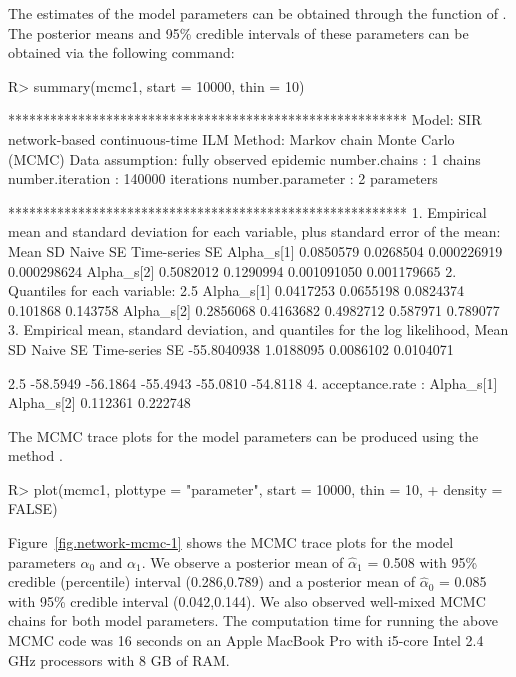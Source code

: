 \documentclass[nojss,shortnames]{jss}
\begin{document}
The estimates of the model parameters can be obtained through the   function of .  
The posterior means and 95\% credible intervals of these parameters can be obtained via the following command:
\begin{Sinput}
R> summary(mcmc1, start = 10000, thin = 10)
\end{Sinput}
\begin{Soutput}
********************************************************* 
Model: SIR network-based continuous-time ILM 
Method: Markov chain Monte Carlo (MCMC) 
Data assumption: fully observed epidemic 
number.chains : 1 chains 
number.iteration : 140000 iterations 
number.parameter : 2 parameters 

********************************************************* 
 1. Empirical mean and standard deviation for each variable,
plus standard error of the mean:
                Mean        SD    Naive SE Time-series SE
Alpha_s[1] 0.0850579 0.0268504 0.000226919    0.000298624
Alpha_s[2] 0.5082012 0.1290994 0.001091050    0.001179665
 2. Quantiles for each variable:
                2.5%       25%       50%      75%    97.5%
Alpha_s[1] 0.0417253 0.0655198 0.0824374 0.101868 0.143758
Alpha_s[2] 0.2856068 0.4163682 0.4982712 0.587971 0.789077
 3. Empirical mean, standard deviation, and quantiles for the log likelihood,
          Mean             SD       Naive SE Time-series SE 
   -55.8040938      1.0188095      0.0086102      0.0104071 

    2.5%      25%      50%      75%    97.5% 
-58.5949 -56.1864 -55.4943 -55.0810 -54.8118 
 4. acceptance.rate : 
Alpha_s[1] Alpha_s[2] 
  0.112361   0.222748 
\end{Soutput}

The MCMC trace plots for  the model parameters can be produced using the  method .
\begin{Sinput}
R> plot(mcmc1, plottype = "parameter", start = 10000, thin = 10, 
+    density = FALSE)
\end{Sinput}

Figure~\ref{fig.network-mcmc-1} shows the MCMC trace plots for the model parameters $\alpha_{0}$ and $\alpha_{1}$. We observe a posterior mean of $\hat{\alpha}_{1}$ = 0.508 with 95\% credible (percentile) interval (0.286,0.789) and a posterior mean of $\hat{\alpha}_{0}$ = 0.085 with 95\% credible interval (0.042,0.144). We also observed well-mixed MCMC chains for both model parameters. 
The computation time for running the above MCMC code was 16 seconds on an Apple MacBook Pro with i5-core Intel 2.4 GHz processors with 8 GB of RAM.
\end{document}
